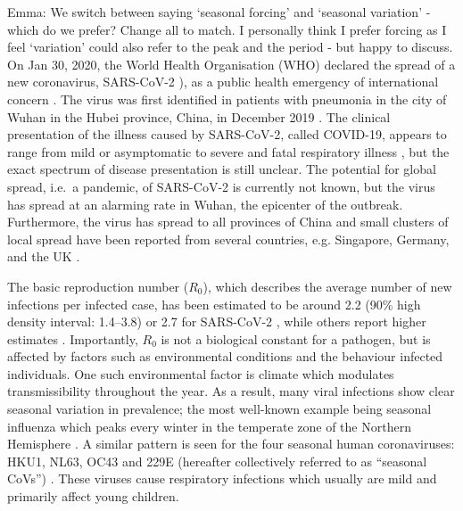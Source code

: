 \documentclass[rmp, reprint, superscriptaddress, floatfix,amsmath]{revtex4-1}
\newcommand{\Jan}[1]{{\color{deepsaffron}Jan: #1}}
\newcommand{\Emma}[1]{{\color{purple}Emma: #1}}
\begin{document}
\Emma{We switch between saying `seasonal forcing' and `seasonal variation' - which do we prefer? Change all to match. I personally think I prefer forcing as I feel `variation' could also refer to the peak and the period - but happy to discuss.}
On Jan 30, 2020, the World Health Organisation (WHO) declared the spread of a new coronavirus, SARS-CoV-2 \citep{ICTV_SARS-CoV-2}), as a public health emergency of international concern \citep{WHO_statement}.
The virus was first identified in patients with pneumonia in the city of Wuhan in the Hubei province, China, in December 2019 \citep{Liangjun2020rna}.
The clinical presentation of the illness caused by SARS-CoV-2, called COVID-19,
appears to range from mild or asymptomatic to severe and fatal respiratory illness \citep{WHO_situation_report23}, but the exact spectrum of disease presentation is still unclear. 
The potential for global spread, i.e.~a pandemic, of SARS-CoV-2 is currently not known, but the virus has spread at an alarming rate in Wuhan, the epicenter of the outbreak. Furthermore, the virus has spread to all provinces of China and small clusters of local spread have been reported from several countries, e.g. Singapore, Germany, and the UK \citep{WHO_situation_report23, rothe2020transmission, MOH_Singapore}. 

The basic reproduction number ($R_0$), which describes the average number of new infections per infected case, has been estimated to be around 2.2 (90\% high density interval: 1.4–3.8) or 2.7 for SARS-CoV-2 \citep{Riou2020pattern,wu_nowcasting_2020}, while others report higher estimates \citep{yang_epidemiological_2020}. Importantly, $R_0$ is not a biological constant for a pathogen, but is affected by factors such as environmental conditions and the behaviour infected individuals. One such environmental factor is climate which modulates transmissibility throughout the year. 
As a result, many viral infections show clear seasonal variation in prevalence; the most well-known example being seasonal influenza which peaks every winter in the temperate zone of the Northern Hemisphere \citep{petrova_evolution_2018}. 
A similar pattern is seen for the four seasonal human coronaviruses: HKU1, NL63, OC43 and 229E (hereafter collectively referred to as ``seasonal CoVs'') \citep{killerby2018human,goes2019typical,galanti2019longitudinal,friedman2018human,al2016diversity,huang2017epidemiology}. 
These viruses cause respiratory infections which usually are mild and primarily affect young children. 
         
\end{document}

